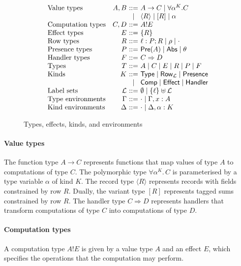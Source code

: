 \documentclass[12pt,mscres,cdtppar,twoside,openright,logo,rightchapter,normalheadings]{infthesis}
\makeatletter
\theoremstyle{definition}
\newcommand{\slab}[1]{\textrm{#1}}
\newcommand{\Record}[1]{\ensuremath{\langle #1 \rangle}}
\newcommand{\Pre}[1]{\mathsf{Pre}(#1)}
\newcommand{\Abs}{\mathsf{Abs}}
\newcommand{\Presence}{\mathsf{Presence}}
\newcommand{\Row}{\mathsf{Row}}
\newcommand{\Type}{\mathsf{Type}}
\newcommand{\Comp}{\mathsf{Comp}}
\newcommand{\Effect}{\mathsf{Effect}}
\newcommand{\Handler}{\mathsf{Handler}}
\newcommand{\eff}{!}
\newcommand{\ba}{\begin{array}}
\newcommand{\ea}{\end{array}}
\newenvironment{syntax}{\[\ba{@{}l@{\quad}r@{~}c@{~}l@{}}}{\ea\]\ignorespacesafterend}
\makeatother
\begin{document}
\begin{figure}
\begin{syntax}
\slab{Value types}    &A,B  &::= & A \to C
                               \mid  \forall \alpha^K.C \\
                             &&\mid& \Record{R} \mid [R]
                               \mid  \alpha \\
\slab{Computation types} 
                      &C,D  &::= & A \eff E \\
\slab{Effect types}   &E    &::= & \{R\}\\
\slab{Row types}      &R    &::= & \ell : P;R \mid \rho \mid \cdot \\
\slab{Presence types} &P    &::= & \Pre{A} \mid \Abs \mid \theta\\
\slab{Handler types}  &F    &::= & C \Rightarrow D \\
\slab{Types}          &T    &::= & A \mid C \mid E \mid R \mid P \mid F \\
\slab{Kinds}          &K    &::= & \Type \mid \Row_\mathcal{L} \mid \Presence\\
                      &     &\mid& \Comp \mid \Effect \mid \Handler \\
\slab{Label sets}     &\mathcal{L} &::=& \emptyset \mid \{\ell\} \uplus \mathcal{L}\\
\slab{Type environments} &\Gamma &::=& \cdot \mid \Gamma, x:A \\
\slab{Kind environments} &\Delta &::=& \cdot \mid \Delta, \alpha:K \\
\end{syntax}
\caption{Types, effects, kinds, and environments}
\label{fig:types-syntax}
\end{figure}

\paragraph{Value types}
The function type $A \to C$ represents functions that map values of
type $A$ to computations of type $C$.  The polymorphic type
$\forall \alpha^K .\, C$ is parameterised by a type variable $\alpha$
of kind $K$. The record type $\Record{R}$ represents records with
fields constrained by row $R$. Dually, the variant type $[R]$
represents tagged sums constrained by row $R$. The handler type
$C \Rightarrow D$ represents handlers that transform computations of
type $C$ into computations of type $D$.

\paragraph{Computation types}
A computation type $A \eff E$ is given by a value type $A$ and an
effect $E$, which specifies the operations that the computation may
perform.
\end{document}
